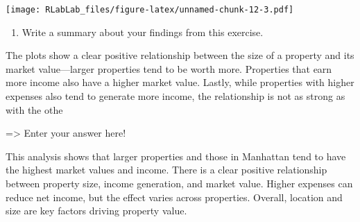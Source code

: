 \documentclass[
]{article}
\providecommand{\tightlist}{%
  \setlength{\itemsep}{0pt}\setlength{\parskip}{0pt}}
\begin{document}
\texttt{[image: RLabLab\_files/figure-latex/unnamed-chunk-12-3.pdf]}

\begin{enumerate}
\def\labelenumi{\alph{enumi}.}
\setcounter{enumi}{2}
\tightlist
\item
  Write a summary about your findings from this exercise.
\end{enumerate}

The plots show a clear positive relationship between the size of a
property and its market value---larger properties tend to be worth more.
Properties that earn more income also have a higher market value.
Lastly, while properties with higher expenses also tend to generate more
income, the relationship is not as strong as with the othe

=\textgreater{} Enter your answer here!

This analysis shows that larger properties and those in Manhattan tend
to have the highest market values and income. There is a clear positive
relationship between property size, income generation, and market value.
Higher expenses can reduce net income, but the effect varies across
properties. Overall, location and size are key factors driving property
value.
\end{document}

